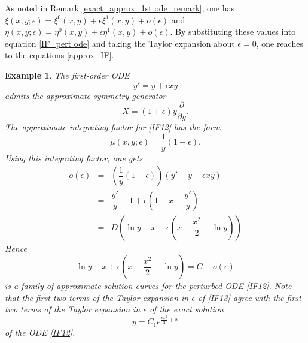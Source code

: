 \documentclass[11pt,letter,subeqn]{article}
\newtheorem{example}{Example}[section]
\begin{document}
As noted in Remark \ref{exact_approx_1st ode_remark}, one has $\xi(x,y;\epsilon)=\xi^0(x,y)+\epsilon \xi^1(x,y)+o(\epsilon)$ and $\eta(x,y;\epsilon)=\eta^0(x,y)+\epsilon \eta^1(x,y)+o(\epsilon)$. By substituting these values into equation \eqref{IF_pert ode} and taking the Taylor expansion about $\epsilon=0$, one reaches to the equations \eqref{approx_IF}.
\begin{example}
  The first-order ODE
  \begin{equation}\label{IF12}
    y'=y+\epsilon xy
  \end{equation}
  admits the approximate symmetry generator
  \[
    X=\left(1+\epsilon\right)y \dfrac{\partial}{\partial y}.
  \]
  The approximate integrating factor for \eqref{IF12} has the form
  \[
    \mu(x,y;\epsilon) = \dfrac{1}{y}\left(1-\epsilon\right).
  \]
  Using this integrating factor, one gets
  \begin{eqnarray}
  \nonumber %
    o(\epsilon) &=& \left(\dfrac{1}{y}\left(1-\epsilon\right)\right)\left(y'-y-\epsilon xy\right) \\
    \nonumber
     &=& \dfrac{y'}{y}-1+\epsilon \left(1-x-\dfrac{y'}{y}\right)  \\
     &=& D\left(\ln y -x +\epsilon \left(x-\dfrac{x^2}{2} -\ln y\right)\right)
  \end{eqnarray}
  Hence
  \begin{equation}\label{IF13}
    \ln y -x +\epsilon \left(x-\dfrac{x^2}{2} -\ln y\right)=C+o(\epsilon)
  \end{equation}
  is a family of approximate solution curves for the perturbed ODE \eqref{IF12}. Note that the first two terms of the Taylor expansion in $\epsilon$ of \eqref{IF13} agree with the first two terms of the Taylor expansion in $\epsilon$ of the exact solution
  \[
    y=C_1e^{ \frac{\epsilon x^2}{2}+x}
  \]
   of the ODE \eqref{IF12}.
\end{example}
\end{document}
